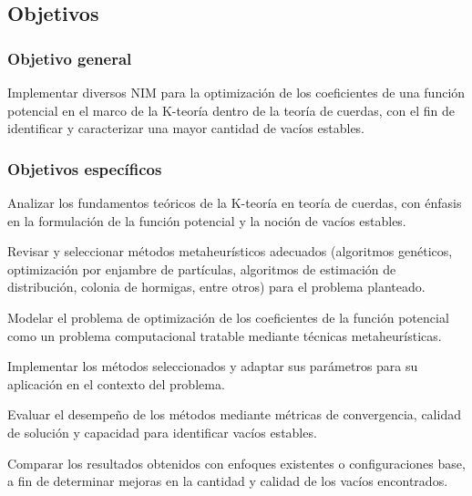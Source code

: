 
\subsection{Objetivos}

\subsubsection{Objetivo general}

Implementar diversos NIM para la optimización de los
coeficientes de una función potencial en el marco de la
K-teoría dentro de la teoría de cuerdas, con el fin de
identificar y caracterizar una mayor cantidad de vacíos
estables.


\subsubsection{Objetivos específicos}

\begin{listaflor}
 \item Analizar los fundamentos teóricos de la K-teoría en teoría de
   cuerdas, con énfasis en la formulación de la función potencial
   y la noción de vacíos estables.
 \item Revisar y seleccionar métodos metaheurísticos adecuados
   (algoritmos genéticos, optimización por enjambre de
   partículas, algoritmos de estimación de distribución,
   colonia de hormigas, entre otros) para el problema
   planteado.
 \item Modelar el problema de optimización de los coeficientes de la
   función potencial como un problema computacional tratable
   mediante técnicas metaheurísticas.
 \item Implementar los métodos seleccionados y adaptar sus parámetros
   para su aplicación en el contexto del problema.
 \item Evaluar el desempeño de los métodos mediante métricas de
   convergencia, calidad de solución y capacidad para identificar
   vacíos estables.
 \item Comparar los resultados obtenidos con enfoques existentes o
   configuraciones base, a fin de determinar mejoras en la
   cantidad y calidad de los vacíos encontrados.
\end{listaflor}

